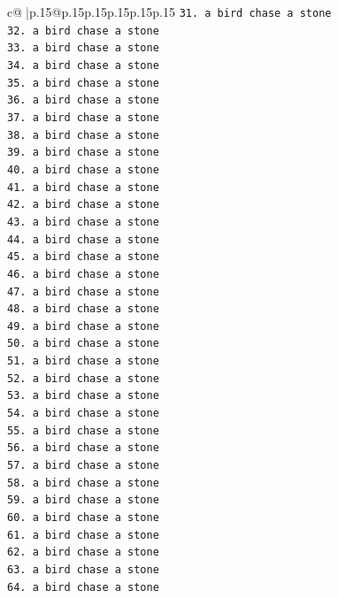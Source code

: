 \documentclass{article}
\begin{document}
{\begin{supertabular}{c@{$\;$}|p{.15\linewidth}@{}p{.15\linewidth}p{.15\linewidth}p{.15\linewidth}p{.15\linewidth}p{.15\linewidth}}
{{{\texttt{31. a bird chase a stone} \\
\texttt{32. a bird chase a stone} \\
\texttt{33. a bird chase a stone} \\
\texttt{34. a bird chase a stone} \\
\texttt{35. a bird chase a stone} \\
\texttt{36. a bird chase a stone} \\
\texttt{37. a bird chase a stone} \\
\texttt{38. a bird chase a stone} \\
\texttt{39. a bird chase a stone} \\
\texttt{40. a bird chase a stone} \\
\texttt{41. a bird chase a stone} \\
\texttt{42. a bird chase a stone} \\
\texttt{43. a bird chase a stone} \\
\texttt{44. a bird chase a stone} \\
\texttt{45. a bird chase a stone} \\
\texttt{46. a bird chase a stone} \\
\texttt{47. a bird chase a stone} \\
\texttt{48. a bird chase a stone} \\
\texttt{49. a bird chase a stone} \\
\texttt{50. a bird chase a stone} \\
\texttt{51. a bird chase a stone} \\
\texttt{52. a bird chase a stone} \\
\texttt{53. a bird chase a stone} \\
\texttt{54. a bird chase a stone} \\
\texttt{55. a bird chase a stone} \\
\texttt{56. a bird chase a stone} \\
\texttt{57. a bird chase a stone} \\
\texttt{58. a bird chase a stone} \\
\texttt{59. a bird chase a stone} \\
\texttt{60. a bird chase a stone} \\
\texttt{61. a bird chase a stone} \\
\texttt{62. a bird chase a stone} \\
\texttt{63. a bird chase a stone} \\
\texttt{64. a bird chase a stone} \\
}}}
\end{supertabular}}
\end{document}
